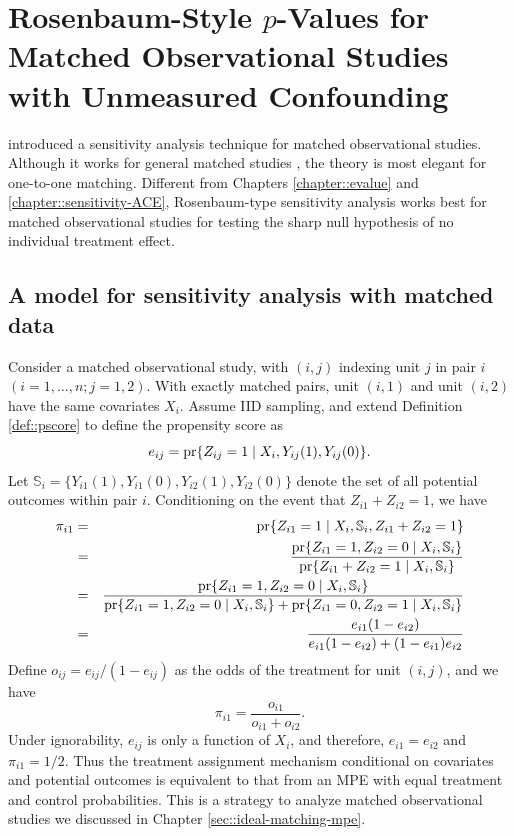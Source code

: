 
\chapter{Rosenbaum-Style $p$-Values for Matched Observational Studies with Unmeasured Confounding}
\label{sec::rosenbaum-sensitivity-analysis}


\citet{rosenbaum1987sensitivity} introduced a sensitivity analysis technique for matched observational studies. Although it works for general matched studies \citep{rosenbaum2002design}, the theory is most elegant for one-to-one matching. 
Different from Chapters \ref{chapter::evalue} and \ref{chapter::sensitivity-ACE}, Rosenbaum-type sensitivity analysis works best for matched observational studies for testing the sharp null hypothesis of no individual treatment effect.  


\section{A model for sensitivity analysis with matched data}


Consider a matched observational study, with $(i,j)$ indexing unit $j$ in pair $i$ $(i=1,\ldots, n; j=1,2)$. 
With exactly matched pairs, unit $(i, 1)$ and unit $(i, 2)$ have the same covariates $X_i$. 
Assume IID sampling, and extend Definition \ref{def::pscore} to define the propensity score as
$$
e_{ij} = \textup{pr}\{  Z_{ij} = 1\mid X_i, Y_{ij}(1), Y_{ij}(0) \} .
$$
Let $\mathbb{S}_i = \{Y_{i1}(1), Y_{i1}(0), Y_{i2}(1), Y_{i2}(0)\}$ denote the set of all potential outcomes within pair $i$. 
Conditioning on the event that $Z_{i1} + Z_{i2} = 1$, we have
\begin{eqnarray*}
\pi_{i1} &=& \textup{pr}\{ Z_{i1} = 1 \mid X_i, \mathbb{S}_i, Z_{i1} + Z_{i2} = 1 \} \\
&=& \frac{ \textup{pr}\{ Z_{i1} = 1, Z_{i2} = 0  \mid X_i, \mathbb{S}_i \} }
{ \textup{pr}\{ Z_{i1} + Z_{i2} = 1 \mid X_i, \mathbb{S}_i \} } \\
&=& \frac{ \textup{pr}\{ Z_{i1} = 1, Z_{i2} = 0  \mid X_i, \mathbb{S}_i \} }{ 
\textup{pr}\{ Z_{i1} = 1, Z_{i2} = 0 \mid X_i, \mathbb{S}_i \} + \textup{pr}\{ Z_{i1} = 0, Z_{i2} = 1 \mid X_i, \mathbb{S}_i \}
}\\
&=& \frac{  e_{i1} (1-e_{i2}) }{ e_{i1} (1-e_{i2}) + (1-e_{i1}) e_{i2}} 
\end{eqnarray*}
Define $o_{ij} = e_{ij} / (1 - e_{ij})$ as the odds of the treatment for unit $(i,j)$, and we have
$$
\pi_{i1}  = \frac{o_{i1}}{  o_{i1} + o_{i2} } . 
$$
Under ignorability, $e_{ij}$ is only a function of $X_i$, and therefore, $e_{i1} = e_{i2}$ and $\pi_{i1} = 1/2 $. Thus the treatment assignment mechanism conditional on covariates and potential outcomes is equivalent to that from an MPE with equal treatment and control probabilities. This is a strategy to analyze matched observational studies we discussed in Chapter \ref{sec::ideal-matching-mpe}. 


